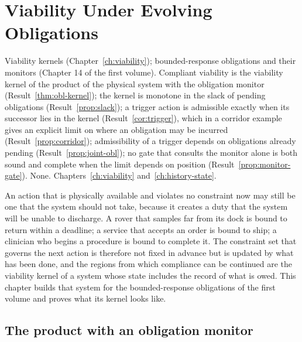 \chapter{Viability Under Evolving Obligations}\label{ch:vobl}
{Viability kernels (Chapter~\ref{ch:viability}); bounded-response obligations and their monitors (Chapter 14 of the first volume).}
{Compliant viability is the viability kernel of the product of the physical system with the obligation monitor (Result~\ref{thm:obl-kernel}); the kernel is monotone in the slack of pending obligations (Result~\ref{prop:slack}); a trigger action is admissible exactly when its successor lies in the kernel (Result~\ref{cor:trigger}), which in a corridor example gives an explicit limit on where an obligation may be incurred (Result~\ref{prop:corridor}); admissibility of a trigger depends on obligations already pending (Result~\ref{prop:joint-obl}); no gate that consults the monitor alone is both sound and complete when the limit depends on position (Result~\ref{prop:monitor-gate}).}
{None.}
{Chapters~\ref{ch:viability} and~\ref{ch:history-state}.}

An action that is physically available and violates no constraint now may still be one that the system should not take, because it creates a duty that the system will be unable to discharge. A rover that samples far from its dock is bound to return within a deadline; a service that accepts an order is bound to ship; a clinician who begins a procedure is bound to complete it. The constraint set that governs the next action is therefore not fixed in advance but is updated by what has been done, and the regions from which compliance can be continued are the viability kernel of a system whose state includes the record of what is owed. This chapter builds that system for the bounded-response obligations of the first volume and proves what its kernel looks like.

\section{The product with an obligation monitor}

